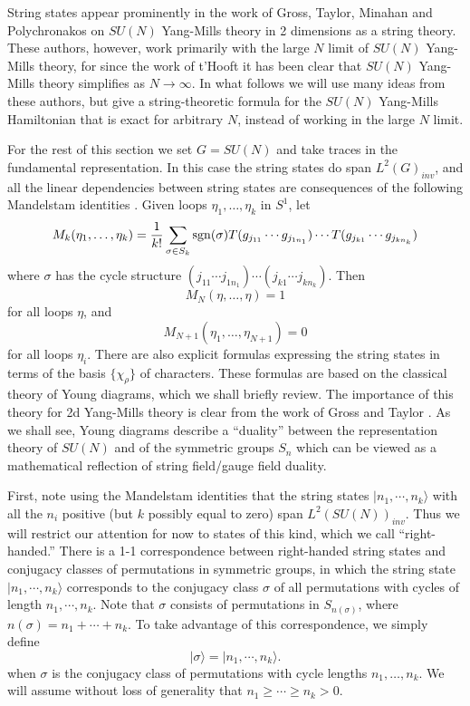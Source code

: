 String states appear prominently in the work of
Gross, Taylor, Minahan and Polychronakos \cite{GT,MP} on
$SU(N)$ Yang-Mills theory in 2 dimensions as a string theory.  These
authors, however, work primarily with the large $N$ limit of $SU(N)$
Yang-Mills theory, for since the
work of t'Hooft \cite{t'Hooft} it has been clear that $SU(N)$ Yang-Mills
theory simplifies as $N \to \infty$.
In what follows we will use many ideas from these authors,
but give a string-theoretic formula
for the $SU(N)$ Yang-Mills Hamiltonian that is exact for arbitrary $N$,
instead of working in the large $N$ limit.

For the rest of this section we set $G = SU(N)$ and take traces in the
fundamental representation.  In this case the string states do span
$L^2(G)_{inv}$, and all the linear dependencies between string states
are consequences of the following Mandelstam identities \cite{GamTri}.
Given loops $\eta_1, \dots, \eta_k$ in $S^1$, let
\[      M_k(\eta_1, \dots, \eta_k) =
{1\over k!} \sum_{\sigma \in S_k} {\rm sgn}(\sigma) T(g_{j_{11}} \cdots
g_{j_{1n_1}}) \cdots T(g_{j_{k1}} \cdots g_{j_{kn_k}}) \]
where $\sigma$ has the cycle structure $(j_{11} \cdots j_{1n_1}) \cdots
(j_{k1} \cdots j_{kn_k})$.  Then
\[       M_N(\eta, \dots, \eta) = 1  \]
for all loops $\eta$, and
\[       M_{N+1}(\eta_1, \dots, \eta_{N+1}) = 0  \]
for all loops $\eta_i$.
There are also explicit formulas expressing the string states in terms
of the basis $\{\chi_\rho\}$ of characters.
These formulas are based on the classical theory of Young diagrams,
which we shall briefly review.
The importance of this theory
for 2d Yang-Mills theory is clear from the work of Gross
and Taylor \cite{Gross,GT}.  As we shall see, Young diagrams describe
a ``duality'' between the representation theory of $SU(N)$ and of the symmetric
groups $S_n$ which can be viewed as a mathematical reflection of string
field/gauge field duality.

First, note using the Mandelstam identities
that the string states $|n_1, \cdots, n_k\rangle$ with all
the $n_i$ positive (but $k$ possibly equal to zero) span
$L^2(SU(N))_{inv}$.  Thus we will restrict our attention for
now to states of this kind, which we call ``right-handed.''
There is a 1-1 correspondence between
right-handed string states and conjugacy classes of
permutations in symmetric groups, in which
the string state $|n_1, \cdots, n_k\rangle$
corresponds to the conjugacy class $\sigma$ of all permutations with cycles
of length $n_1, \cdots, n_k$.
Note that $\sigma$ consists of permutations in $S_{n(\sigma)}$, where
$n(\sigma) = n_1 + \cdots + n_k$.   To take advantage of this
correspondence, we simply define
\[       |\sigma\rangle = |n_1, \cdots, n_k\rangle  .\]
when $\sigma$ is the conjugacy class of permutations with cycle lengths
$n_1, \dots, n_k$.   We will assume without loss of generality that
$n_1 \ge \cdots \ge n_k > 0$.

